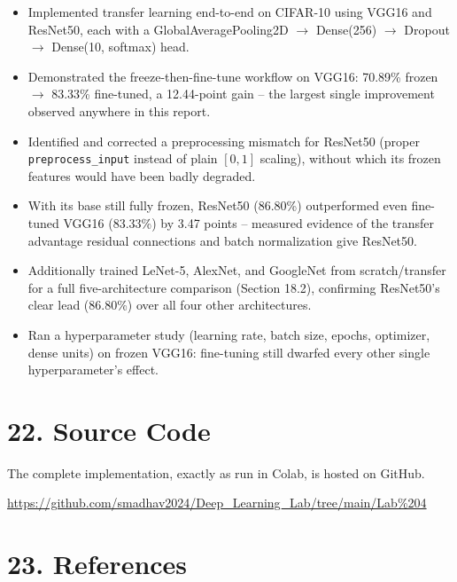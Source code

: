 \documentclass[11pt]{article}
\begin{document}
\begin{itemize}

\item Implemented transfer learning end-to-end on CIFAR-10 using
VGG16 and ResNet50, each with a GlobalAveragePooling2D $\to$
Dense(256) $\to$ Dropout $\to$ Dense(10, softmax) head.

\item Demonstrated the freeze-then-fine-tune workflow on VGG16:
70.89\% frozen $\to$ 83.33\% fine-tuned, a 12.44-point gain -- the
largest single improvement observed anywhere in this report.

\item Identified and corrected a preprocessing mismatch for
ResNet50 (proper \texttt{preprocess\_input} instead of plain
$[0,1]$ scaling), without which its frozen features would have been
badly degraded.

\item With its base still fully frozen, ResNet50 (86.80\%)
outperformed even fine-tuned VGG16 (83.33\%) by 3.47 points --
measured evidence of the transfer advantage residual connections and
batch normalization give ResNet50.

\item Additionally trained LeNet-5, AlexNet, and GoogleNet from
scratch/transfer for a full five-architecture comparison
(Section 18.2), confirming ResNet50's clear lead (86.80\%) over all
four other architectures.

\item Ran a hyperparameter study (learning rate, batch size, epochs,
optimizer, dense units) on frozen VGG16: fine-tuning still dwarfed
every other single hyperparameter's effect.

\end{itemize}

\section*{22. Source Code}

The complete implementation, exactly as run in Colab, is hosted on
GitHub.

\url{https://github.com/smadhav2024/Deep_Learning_Lab/tree/main/Lab%204}

\section*{23. References}
\end{document}
